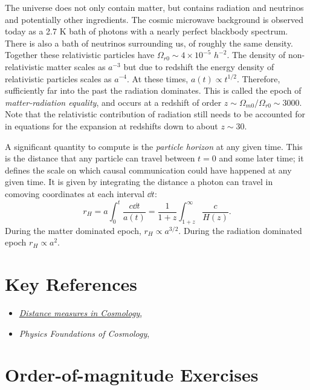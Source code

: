 The universe does not only contain matter, but contains radiation and
neutrinos and potentially other ingredients.  The cosmic microwave
background is observed today as a 2.7 K bath of photons with a nearly
perfect blackbody spectrum.  There is also a bath of neutrinos
surrounding us, of roughly the same density. Together these
relativistic particles have $\Omega_{r0} \sim 4\times 10^{-5}$
$h^{-2}$.  The density of non-relativistic matter scales as $a^{-3}$
but due to redshift the energy density of relativistic particles
scales as $a^{-4}$. At these times, $a(t)\propto t^{1/2}$. Therefore,
sufficiently far into the past the radiation dominates.  This is
called the epoch of {\it matter-radiation equality}, and occurs at a
redshift of order $z \sim \Omega_{m0}/\Omega_{r0} \sim 3000$. Note that the
relativistic contribution of radiation still needs to be accounted for
in equations for the expansion at redshifts down to about $z\sim 30$.

A significant quantity to compute is the {\it particle horizon} at any
given time. This is the distance that any particle can travel between
$t=0$ and some later time; it defines the scale on which causal
communication could have happened at any given time. It is given by
integrating the distance a photon can travel in comoving coordinates
at each interval $\dd t$:
\begin{equation}
r_H = a \int_0^t \frac{c \dd t}{a(t)}
= \frac{1}{1+z} \int_{1+z}^\infty \frac{c}{H(z)}.
\end{equation}
During the matter dominated epoch, $r_H\propto a^{3/2}$. During the
radiation dominated epoch $r_H\propto a^2$.

\section{Key References}

\begin{itemize}
  \item
    \href{http://adsabs.harvard.edu/abs/1999astro.ph..5116H}{
    {\it Distance measures in Cosmology},
      \citet{hogg99cosm}}
  \item
    {\it Physics Foundations of Cosmology},
    \citet{mukhanov05a}
\end{itemize}

\section{Order-of-magnitude Exercises}

